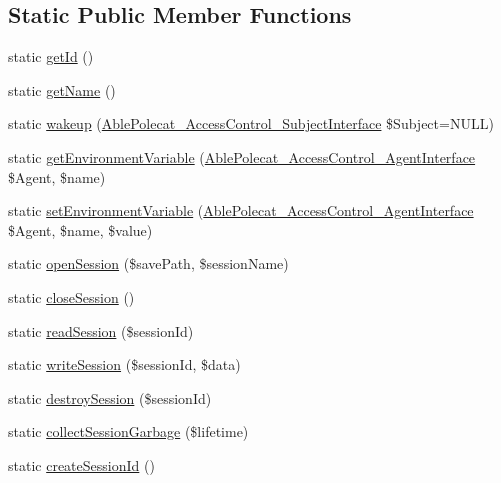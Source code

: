 \subsection*{Static Public Member Functions}
\begin{DoxyCompactItemize}
\item 
static \hyperlink{class_able_polecat___mode___session_acfaa3a96d0cb5a4c0d4d710dcba41e9e}{get\+Id} ()
\item 
static \hyperlink{class_able_polecat___mode___session_a4ef9bd37ba3ce8a13c1e8bcf4f72a630}{get\+Name} ()
\item 
static \hyperlink{class_able_polecat___mode___session_a3f2135f6ad45f51d075657f6d20db2cd}{wakeup} (\hyperlink{interface_able_polecat___access_control___subject_interface}{Able\+Polecat\+\_\+\+Access\+Control\+\_\+\+Subject\+Interface} \$Subject=N\+U\+L\+L)
\item 
static \hyperlink{class_able_polecat___mode___session_a04e7e0f41da8037ae797868b61b6df77}{get\+Environment\+Variable} (\hyperlink{interface_able_polecat___access_control___agent_interface}{Able\+Polecat\+\_\+\+Access\+Control\+\_\+\+Agent\+Interface} \$Agent, \$name)
\item 
static \hyperlink{class_able_polecat___mode___session_a68bdefd00518f09963ea3fa95cd2a242}{set\+Environment\+Variable} (\hyperlink{interface_able_polecat___access_control___agent_interface}{Able\+Polecat\+\_\+\+Access\+Control\+\_\+\+Agent\+Interface} \$Agent, \$name, \$value)
\item 
static \hyperlink{class_able_polecat___mode___session_ae60835168c2d61914c8b76491b5f52a2}{open\+Session} (\$save\+Path, \$session\+Name)
\item 
static \hyperlink{class_able_polecat___mode___session_a5bf8cadb9c0360e64c3b2dc4e1c1f086}{close\+Session} ()
\item 
static \hyperlink{class_able_polecat___mode___session_a065cc1c4e202e7b7543035f944b811de}{read\+Session} (\$session\+Id)
\item 
static \hyperlink{class_able_polecat___mode___session_a9af5947a2535416b5af53db02a47fa19}{write\+Session} (\$session\+Id, \$data)
\item 
static \hyperlink{class_able_polecat___mode___session_a702bed9f8676ac48dc8186bb516d7fe1}{destroy\+Session} (\$session\+Id)
\item 
static \hyperlink{class_able_polecat___mode___session_ab28f62aa08c1b2156d70700ee9bd2504}{collect\+Session\+Garbage} (\$lifetime)
\item 
static \hyperlink{class_able_polecat___mode___session_acb3fc86b241bf55942bd3a72f15bdc18}{create\+Session\+Id} ()

\end{DoxyCompactItemize}
